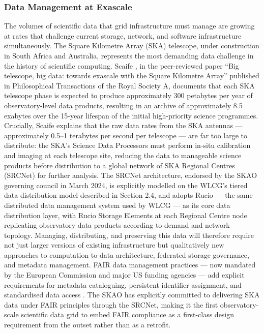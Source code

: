 \documentclass[12pt,a4paper]{report}
\begin{document}
\subsubsection{Data Management at Exascale}
The volumes of scientific data that grid infrastructure must manage are growing at rates that challenge current storage, network, and software
 infrastructure simultaneously. The Square Kilometre Array (SKA) telescope, under construction in South Africa and Australia, represents the most 
 demanding data challenge in the history of scientific computing. Scaife \parencite{scaife2020}, in the peer-reviewed paper “Big telescope, big data: towards 
 exascale with the Square Kilometre Array” published in Philosophical Transactions of the Royal Society A, documents that each SKA telescope phase 
 is expected to produce approximately 300 petabytes per year of observatory-level data products, resulting in an archive of approximately 8.5 exabytes
  over the 15-year lifespan of the initial high-priority science programmes. Crucially, Scaife explains that the raw data rates from the SKA 
  antennas — approximately 0.5–1 terabytes per second per telescope — are far too large to distribute: the SKA’s Science Data Processors must 
  perform in-situ calibration and imaging at each telescope site, reducing the data to manageable science products before distribution to a global 
  network of SKA Regional Centres (SRCNet) for further analysis. The SRCNet architecture, endorsed by the SKAO governing council in March 2024, is 
  explicitly modelled on the WLCG’s tiered data distribution model described in Section 2.4, and adopts Rucio — the same distributed data management
   system used by WLCG — as its core data distribution layer, with Rucio Storage Elements at each Regional Centre node replicating observatory data 
   products according to demand and network topology. Managing, distributing, and preserving this data will therefore require not just larger versions
    of existing infrastructure but qualitatively new approaches to computation-to-data architecture, federated storage governance, and metadata management.
     FAIR data management practices — now mandated by the European Commission and major US funding agencies — add explicit requirements for metadata 
     cataloguing, persistent identifier assignment, and standardised data access \parencite{wilkinson2016fair}. The SKAO has explicitly committed to
      delivering SKA data under FAIR principles through the SRCNet, making it the first observatory-scale scientific data grid to embed FAIR 
      compliance as a first-class design requirement from the outset rather than as a retrofit.
 
\end{document}
